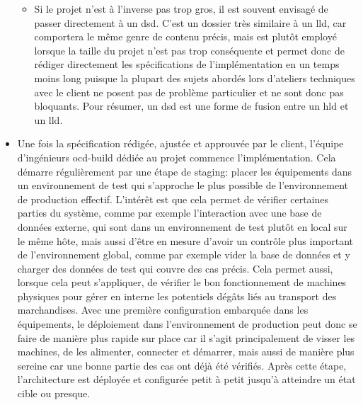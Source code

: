 \documentclass[12pt, oneside, a4paper, titlepage]{report}
\begin{document}
\begin{itemize}
\begin{itemize}
        \item Si le projet n'est à l'inverse pas trop gros, il est souvent
            envisagé de passer directement à un \gls{dsd}. C'est un dossier très
            similaire à un \gls{lld}, car comportera le même genre de contenu
            précis, mais est plutôt employé lorsque la taille du projet n'est
            pas trop conséquente et permet donc de rédiger directement les
            spécifications de l'implémentation en un temps moins long puisque la
            plupart des sujets abordés lors d'ateliers techniques avec le client
            ne posent pas de problème particulier et ne sont donc pas bloquants.
            Pour résumer, un \gls{dsd} est une forme de fusion entre un
            \gls{hld} et un \gls{lld}.

    \end{itemize}

    \item Une fois la spécification rédigée, ajustée et approuvée par le client,
        l'équipe d'ingénieurs \gls{ocd-build} dédiée au projet commence
        l'implémentation. Cela démarre régulièrement par une étape de
        \gls{staging}: placer les équipements dans un environnement de test qui
        s'approche le plus possible de l'environnement de production effectif.
        L'intérêt est que cela permet de vérifier certaines parties du système,
        comme par exemple l'interaction avec une base de données externe, qui
        sont dans un environnement de test plutôt en local sur le même hôte,
        mais aussi d'être en mesure d'avoir un contrôle plus important de
        l'environnement global, comme par exemple vider la base de données et y
        charger des données de test qui couvre des cas précis. Cela permet
        aussi, lorsque cela peut s'appliquer, de vérifier le bon fonctionnement
        de machines physiques pour gérer en interne les potentiels dégâts liés
        au transport des marchandises. Avec une première configuration embarquée
        dans les équipements, le déploiement dans l'environnement de production
        peut donc se faire de manière plus rapide sur place car il s'agit
        principalement de visser les machines, de les alimenter, connecter et
        démarrer, mais aussi de manière plus sereine car une bonne partie des
        cas ont déjà été vérifiés. Après cette étape, l'architecture est
        déployée et configurée petit à petit jusqu'à atteindre un état cible ou
        presque.


\end{itemize}
\end{document}
